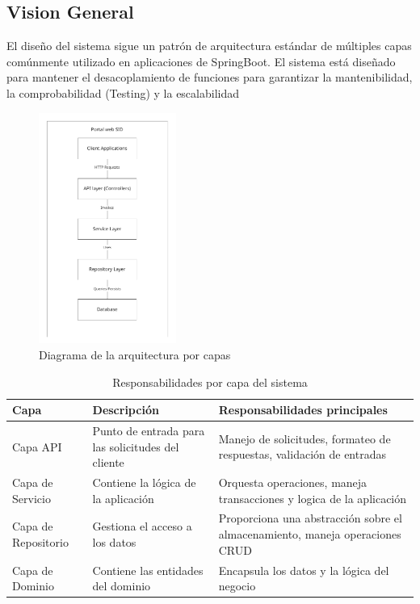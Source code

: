 \documentclass[11pt,a4paper]{article}
\begin{document}
\subsection{Vision General}
El diseño del sistema sigue un patrón de arquitectura estándar de múltiples capas comúnmente utilizado en aplicaciones de SpringBoot.
El sistema está diseñado para mantener el desacoplamiento de funciones para garantizar la mantenibilidad, la comprobabilidad (Testing) y la
escalabilidad
\begin{figure}[H]
	\centering
	\includegraphics[width=0.4\textwidth]{src/SID_PortalWEB_D1.pdf}
	\caption{Diagrama de la arquitectura por capas}
\end{figure}

\begin{table}[h!]
	\centering
	\begin{tabular}{|l|p{4cm}|p{7cm}|}
		\hline
		\textbf{Capa}       & \textbf{Descripción}                              & \textbf{Responsabilidades principales}                                       \\
		\hline
		Capa API            & Punto de entrada para las solicitudes del cliente & Manejo de solicitudes, formateo de respuestas, validación de entradas        \\
		\hline
		Capa de Servicio    & Contiene la lógica de la aplicación               & Orquesta operaciones, maneja transacciones y logica de la aplicación         \\
		\hline
		Capa de Repositorio & Gestiona el acceso a los datos                    & Proporciona una abstracción sobre el almacenamiento, maneja operaciones CRUD \\
		\hline
		Capa de Dominio     & Contiene las entidades del dominio                & Encapsula los datos y la lógica del negocio                                  \\
		\hline
	\end{tabular}
	\caption{Responsabilidades por capa del sistema}
\end{table}
\end{document}
